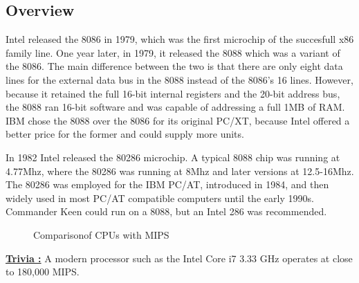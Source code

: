 \documentclass[book.tex]{subfiles}
\begin{document}
\subsection{Overview}
  Intel released the 8086 in 1979, which was the first microchip of the succesfull x86 family line. One year later, in 1979, it released the 8088 which was a variant of the 8086. The main difference between the two is that there are only eight data lines for the external data bus in the 8088 instead of the 8086's 16 lines.  However, because it retained the full 16-bit internal registers and the 20-bit address bus, the 8088 ran 16-bit software and was capable of addressing a full 1MB of RAM. IBM chose the 8088 over the 8086 for its original PC/XT, because Intel offered a better price for the former and could supply more units. \\
  \par
  In 1982 Intel released the 80286 microchip. A typical 8088 chip was running at 4.77Mhz, where the 80286 was running at 8Mhz and later versions at 12.5-16Mhz. The 80286 was employed for the IBM PC/AT, introduced in 1984, and then widely used in most PC/AT compatible computers until the early 1990s. Commander Keen could run on a 8088, but an Intel 286 was recommended.\\   

\par


\begin{figure}[H]
\centering
   \caption{Comparison\protect\footnotemark of CPUs with MIPS}
 \end{figure}
 \par
 \par
  \textbf{\underline{Trivia :}} A modern processor such as the Intel Core i7 3.33 GHz operates at close to 180,000 MIPS.\\
  \par
\end{document}
